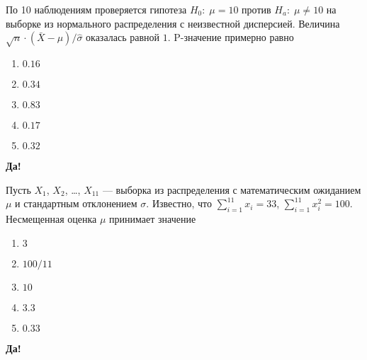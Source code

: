\documentclass[t]{beamer}
\begin{document}
 \begin{frame} \label{32-Yes} 
\begin{block}{32} 

По 10 наблюдениям проверяется гипотеза $H_0: \; \mu=10$ против $H_a: \; \mu \neq 10$ на выборке из нормального распределения с неизвестной дисперсией. Величина $\sqrt{n}\cdot (\bar{X}-\mu)/\hat{\sigma}$ оказалась равной $1$. P-значение примерно равно
 


 \end{block} 
\begin{enumerate} 
\item[] \hyperlink{32-Yes}{\beamergotobutton{} $0.16$}
\item[] \hyperlink{32-No}{\beamergotobutton{} $0.34$}
\item[] \hyperlink{32-No}{\beamergotobutton{} $0.83$}
\item[] \hyperlink{32-No}{\beamergotobutton{} $0.17$}
\item[] \hyperlink{32-No}{\beamergotobutton{} $0.32$}
\end{enumerate} 

 \textbf{Да!} 
 \hyperlink{33}{}\end{frame} 


 \begin{frame} \label{33-Yes} 
\begin{block}{33} 

Пусть $X_1$, $X_2$, \ldots, $X_{11}$ — выборка из распределения с математическим ожиданием $\mu$ и стандартным отклонением $\sigma$. Известно, что $\sum_{i=1}^{11}x_i=33$, $\sum_{i=1}^{11}x_i^2=100$. Несмещенная оценка $\mu$ принимает значение
 


 \end{block} 
\begin{enumerate} 
\item[] \hyperlink{33-Yes}{\beamergotobutton{} $3$}
\item[] \hyperlink{33-No}{\beamergotobutton{} $100/11$}
\item[] \hyperlink{33-No}{\beamergotobutton{} $10$}
\item[] \hyperlink{33-No}{\beamergotobutton{} $3.3$}
\item[] \hyperlink{33-No}{\beamergotobutton{} $0.33$}
\end{enumerate} 

 \textbf{Да!} 
 \hyperlink{34}{}\end{frame} 
\end{document}
